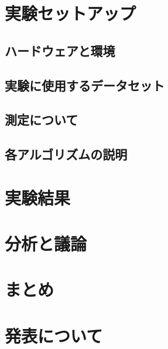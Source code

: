 \documentclass[a4j, 12pt]{jarticle}
\begin{document}
\section{実験セットアップ}
\subsection{ハードウェアと環境}
\subsection{実験に使用するデータセット}
\subsection{測定について}
\subsection{各アルゴリズムの説明}
\section{実験結果}
\section{分析と議論}
\section{まとめ}
\section{発表について}
\end{document}
